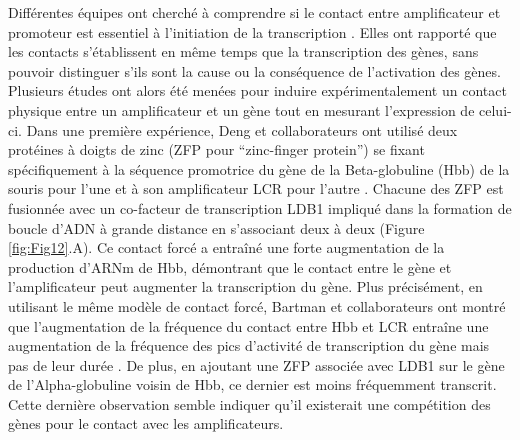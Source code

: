 Différentes équipes ont cherché à comprendre si le contact entre \gls{amplificateur} et promoteur est essentiel à l’initiation de la transcription \citep{carter_long-range_2002}. Elles ont rapporté que les contacts s'établissent en même temps que la transcription des gènes, sans pouvoir distinguer s’ils sont la cause ou la conséquence de l'activation des gènes. Plusieurs études ont alors été menées pour induire expérimentalement un contact physique entre un \gls{amplificateur} et un gène tout en mesurant l’expression de celui-ci. Dans une première expérience, Deng et collaborateurs ont utilisé deux protéines à doigts de zinc (ZFP pour “zinc-finger protein”) se fixant spécifiquement à la séquence promotrice du gène de la Beta-globuline (Hbb) de la souris pour l’une et à son \gls{amplificateur} LCR pour l’autre \citep{deng_controlling_2012}. Chacune des ZFP est fusionnée avec un co-facteur de transcription LDB1 impliqué dans la formation de boucle d’ADN à grande distance en s’associant deux à deux (Figure \ref{fig:Fig12}.A). Ce contact forcé a entraîné une forte augmentation de la production d’\acrshort{ARNm} de Hbb, démontrant que le contact entre le gène et l’\gls{amplificateur} peut augmenter la transcription du gène. Plus précisément, en utilisant le même modèle de contact forcé, Bartman et collaborateurs ont montré que l’augmentation de la fréquence du contact entre Hbb et LCR entraîne une augmentation de la fréquence des pics d’activité de transcription du gène mais pas de leur durée \citep{bartman_enhancer_2016}. De plus, en ajoutant une ZFP associée avec LDB1 sur le gène de l’Alpha-globuline voisin de Hbb, ce dernier est moins fréquemment transcrit. Cette dernière observation semble indiquer qu’il existerait une compétition des gènes pour le contact avec les \glspl{amplificateur}.

